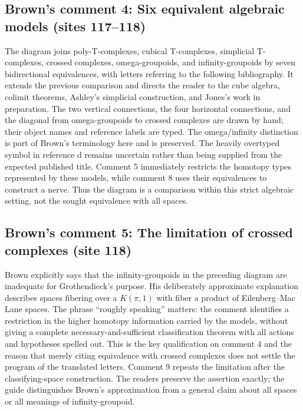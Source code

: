 \documentclass[10pt,oneside]{book}
\begin{document}
\subsection*{Brown's comment 4: Six equivalent algebraic models (sites 117--118)}
The diagram joins poly-T-complexes, cubical T-complexes, simplicial T-complexes, crossed complexes, omega-groupoids, and infinity-groupoids by seven bidirectional equivalences, with letters referring to the following bibliography. It extends the previous comparison and directs the reader to the cube algebra, colimit theorems, Ashley's simplicial construction, and Jones's work in preparation. The two vertical connections, the four horizontal connections, and the diagonal from omega-groupoids to crossed complexes are drawn by hand; their object names and reference labels are typed. The omega/infinity distinction is part of Brown's terminology here and is preserved. The heavily overtyped symbol in reference d remains uncertain rather than being supplied from the expected published title. Comment 5 immediately restricts the homotopy types represented by these models, while comment 8 uses their equivalences to construct a nerve. Thus the diagram is a comparison within this strict algebraic setting, not the sought equivalence with all spaces.

\subsection*{Brown's comment 5: The limitation of crossed complexes (site 118)}
Brown explicitly says that the infinity-groupoids in the preceding diagram are inadequate for Grothendieck's purpose. His deliberately approximate explanation describes spaces fibering over a $K(\pi,1)$ with fiber a product of Eilenberg--Mac Lane spaces. The phrase ``roughly speaking'' matters: the comment identifies a restriction in the higher homotopy information carried by the models, without giving a complete necessary-and-sufficient classification theorem with all actions and hypotheses spelled out. This is the key qualification on comment 4 and the reason that merely citing equivalence with crossed complexes does not settle the program of the translated letters. Comment 9 repeats the limitation after the classifying-space construction. The readers preserve the assertion exactly; the guide distinguishes Brown's approximation from a general claim about all spaces or all meanings of infinity-groupoid.
\end{document}

